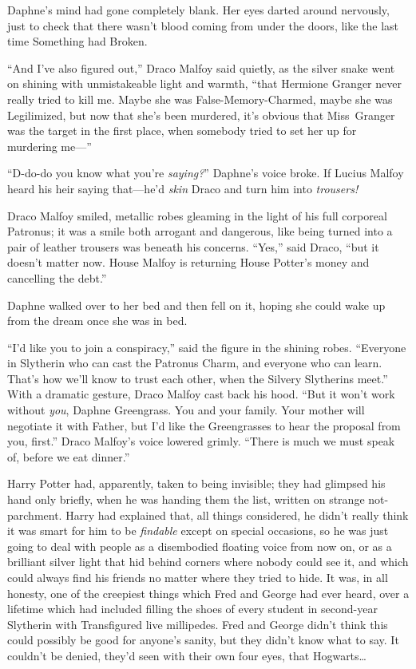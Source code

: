 Daphne’s mind had gone completely blank. Her eyes darted around nervously, just to check that there wasn’t blood coming from under the doors, like the last time Something had Broken.

“And I’ve also figured out,” Draco Malfoy said quietly, as the silver snake went on shining with unmistakeable light and warmth, “that Hermione Granger never really tried to kill me. Maybe she was False-Memory-Charmed, maybe she was Legilimized, but now that she’s been murdered, it’s obvious that Miss~Granger was the target in the first place, when somebody tried to set her up for murdering me—”

“D-do-do you know what you’re \emph{saying?}” Daphne’s voice broke. If Lucius Malfoy heard his heir saying that—he’d \emph{skin} Draco and turn him into \emph{trousers!}

Draco Malfoy smiled, metallic robes gleaming in the light of his full corporeal Patronus; it was a smile both arrogant and dangerous, like being turned into a pair of leather trousers was beneath his concerns. “Yes,” said Draco, “but it doesn’t matter now. House Malfoy is returning House Potter’s money and cancelling the debt.”

Daphne walked over to her bed and then fell on it, hoping she could wake up from the dream once she was in bed.

“I’d like you to join a conspiracy,” said the figure in the shining robes. “Everyone in Slytherin who can cast the Patronus Charm, and everyone who can learn. That’s how we’ll know to trust each other, when the Silvery Slytherins meet.” With a dramatic gesture, Draco Malfoy cast back his hood. “But it won’t work without \emph{you}, Daphne Greengrass. You and your family. Your mother will negotiate it with Father, but I’d like the Greengrasses to hear the proposal from you, first.” Draco Malfoy’s voice lowered grimly. “There is much we must speak of, before we eat dinner.”

\later

Harry Potter had, apparently, taken to being invisible; they had glimpsed his hand only briefly, when he was handing them the list, written on strange not-parchment. Harry had explained that, all things considered, he didn’t really think it was smart for him to be \emph{findable} except on special occasions, so he was just going to deal with people as a disembodied floating voice from now on, or as a brilliant silver light that hid behind corners where nobody could see it, and which could always find his friends no matter where they tried to hide. It was, in all honesty, one of the creepiest things which Fred and George had ever heard, over a lifetime which had included filling the shoes of every student in second-year Slytherin with Transfigured live millipedes. Fred and George didn’t think this could possibly be good for anyone’s sanity, but they didn’t know what to say. It couldn’t be denied, they’d seen with their own four eyes, that Hogwarts…

